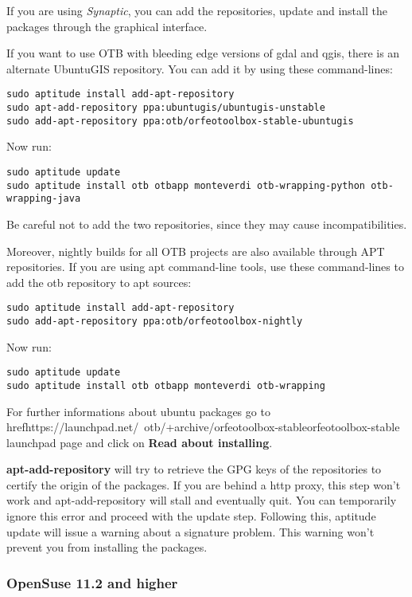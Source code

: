 If you are using \emph{Synaptic}, you can add the repositories, update and install the packages through the
graphical interface.

If you want to use OTB with bleeding edge versions of gdal and qgis, there is an alternate UbuntuGIS repository.
You can add it by using these command-lines:
\begin{verbatim}
sudo aptitude install add-apt-repository 
sudo apt-add-repository ppa:ubuntugis/ubuntugis-unstable
sudo add-apt-repository ppa:otb/orfeotoolbox-stable-ubuntugis
\end{verbatim}
Now run:
\begin{verbatim}
sudo aptitude update
sudo aptitude install otb otbapp monteverdi otb-wrapping-python otb-wrapping-java
\end{verbatim}

Be careful not to add the two repositories, since they may cause incompatibilities.

Moreover, nightly builds for all OTB projects are also available through APT repositories.
If you are using apt command-line tools, use these command-lines to add the otb repository to apt sources:
\begin{verbatim}
sudo aptitude install add-apt-repository 
sudo add-apt-repository ppa:otb/orfeotoolbox-nightly
\end{verbatim}
Now run:
\begin{verbatim}
sudo aptitude update
sudo aptitude install otb otbapp monteverdi otb-wrapping
\end{verbatim}

For further informations about ubuntu packages go to href{https://launchpad.net/~otb/+archive/orfeotoolbox-stable}{orfeotoolbox-stable launchpad page} and click on \textbf{Read about installing}.

\textbf{apt-add-repository} will try to retrieve the GPG keys of the repositories to certify the origin of the packages. If you are behind a http proxy, this step won't work and apt-add-repository will stall and eventually quit. You can temporarily ignore this error and proceed with the update step. Following this, aptitude update will issue a warning about a signature problem. This warning won't prevent you from installing the packages.

\subsubsection{OpenSuse 11.2 and higher}
\label{ssec:opensuse_binaries}

